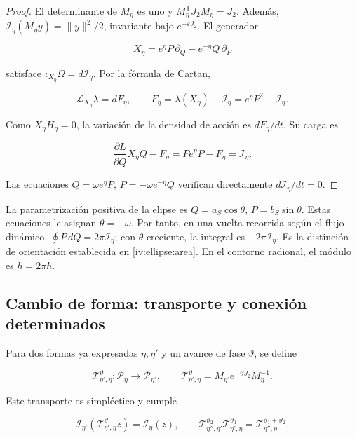 \begin{proof}
El determinante de \(M_\eta\) es uno y \(M_\eta^{\mathsf T}J_2M_\eta=J_2\). Además,
\(\mathcal I_\eta(M_\eta y)=\|y\|^2/2\), invariante bajo \(e^{-\varepsilon J_2}\).
El generador

\[
X_\eta=e^\eta P\,\partial_Q-e^{-\eta}Q\,\partial_P
\]

satisface \(\iota_{X_\eta}\Omega=d\mathcal I_\eta\). Por la fórmula de Cartan,

\[
\mathcal L_{X_\eta}\lambda=dF_\eta,\qquad
F_\eta=\lambda(X_\eta)-\mathcal I_\eta=e^\eta P^2-\mathcal I_\eta.
\]

Como \(X_\eta H_\eta=0\), la variación de la densidad de acción es \(dF_\eta/dt\). Su carga es

\[
\frac{\partial L}{\partial\dot Q}X_\eta Q-F_\eta
=Pe^\eta P-F_\eta=\mathcal I_\eta.
\]

Las ecuaciones \(\dot Q=\omega e^\eta P\), \(\dot P=-\omega e^{-\eta}Q\) verifican directamente \(d\mathcal I_\eta/dt=0\).
\end{proof}

La parametrización positiva de la elipse es \(Q=a_S\cos\theta\), \(P=b_S\sin\theta\). Estas ecuaciones le asignan \(\dot\theta=-\omega\). Por tanto, en una vuelta recorrida según el flujo dinámico, \(\oint P\,dQ=2\pi\mathcal I_\eta\); con \(\theta\) creciente, la integral es \(-2\pi\mathcal I_\eta\). Es la distinción de orientación establecida en \cref{iv:ellipse:area}. En el contorno radional, el módulo es \(h=2\pi\hbar\).

\subsection{Cambio de forma: transporte y conexión determinados}

Para dos formas ya expresadas \(\eta,\eta'\) y un avance de fase \(\vartheta\), se define

\begin{equation}
\mathcal T_{\eta',\eta}^{\vartheta}:\mathcal P_\eta\to\mathcal P_{\eta'},
\qquad
\mathcal T_{\eta',\eta}^{\vartheta}
=M_{\eta'}e^{-\vartheta J_2}M_\eta^{-1}.
\label{nuc07:eq:4}
\end{equation}

\begin{proposition}
Este transporte es simpléctico y cumple

\begin{equation}
\mathcal I_{\eta'}(\mathcal T_{\eta',\eta}^{\vartheta}z)
=\mathcal I_\eta(z),\qquad
\mathcal T_{\eta'',\eta'}^{\vartheta_2}
\mathcal T_{\eta',\eta}^{\vartheta_1}
=\mathcal T_{\eta'',\eta}^{\vartheta_1+\vartheta_2}.
\label{nuc07:eq:5}
\end{equation}
\end{proposition}

